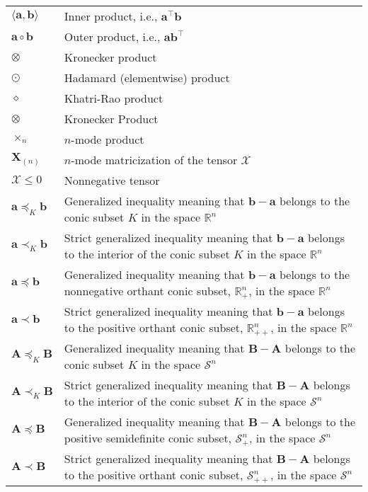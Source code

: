 \documentclass{article}
\newcommand{\inner}[2]{\ensuremath{\langle#1,#2\rangle}} %
\begin{document}
\begin{xltabular}{\textwidth}{XX}
    \(\inner{\mathbf{a}}{\mathbf{b}}\) & Inner product, i.e., \(\mathbf{a}^\top\mathbf{b}\)\\
    \(\mathbf{a} \circ \mathbf{b}\) & Outer product, i.e., \(\mathbf{a}\mathbf{b}^\top\)\\
    \(\otimes\) & Kronecker product\\
    \(\odot\) & Hadamard (elementwise) product\\
    \(\diamond\) & Khatri-Rao product\\
    \(\otimes\) & Kronecker Product\\
    \(\times_n\) & \(n\)-mode product\\
    \(\mathbf{X}_{(n)}\) & \(n\)-mode matricization of the tensor \(\bm{\mathcal{X}}\)\\
    \(\bm{\mathcal{X}} \leq 0\) & Nonnegative tensor\\
    \(\mathbf{a} \preceq_K \mathbf{b}\) & Generalized inequality meaning that \(\mathbf{b}-\mathbf{a}\) belongs to the conic subset \(K\) in the space \(\mathbb{R}^{n}\)\\
    \(\mathbf{a} \prec_K \mathbf{b}\) & Strict generalized inequality meaning that \(\mathbf{b}-\mathbf{a}\) belongs to the interior of the conic subset \(K\) in the space \(\mathbb{R}^{n}\)\\
    \(\mathbf{a} \preceq \mathbf{b}\) & Generalized inequality meaning that \(\mathbf{b}-\mathbf{a}\) belongs to the nonnegative orthant conic subset, \(\mathbb{R}_{+}^{n}\), in the space \(\mathbb{R}^{n}\)\\
    \(\mathbf{a} \prec \mathbf{b}\) & Strict generalized inequality meaning that \(\mathbf{b}-\mathbf{a}\) belongs to the positive orthant conic subset, \(\mathbb{R}_{++}^{n}\), in the space \(\mathbb{R}^{n}\)\\
    \(\mathbf{A} \preceq_K \mathbf{B}\) & Generalized inequality meaning that \(\mathbf{B}-\mathbf{A}\) belongs to the conic subset \(K\) in the space \(\mathcal{S}^{n}\)\\
    \(\mathbf{A} \prec_K \mathbf{B}\) & Strict generalized inequality meaning that \(\mathbf{B}-\mathbf{A}\) belongs to the interior of the conic subset \(K\) in the space \(\mathcal{S}^{n}\)\\
    \(\mathbf{A} \preceq \mathbf{B}\) & Generalized inequality meaning that \(\mathbf{B}-\mathbf{A}\) belongs to the positive semidefinite conic subset, \(\mathcal{S}_{+}^{n}\), in the space \(\mathcal{S}^{n}\)\\
    \(\mathbf{A} \prec \mathbf{B}\) & Strict generalized inequality meaning that \(\mathbf{B}-\mathbf{A}\) belongs to the positive orthant conic subset, \(\mathcal{S}_{++}^{n}\), in the space \(\mathcal{S}^{n}\)
\end{xltabular}
\end{document}
